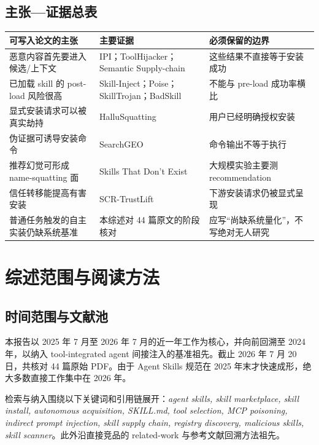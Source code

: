 \documentclass[11pt,a4paper]{ctexart}
\begin{document}
\subsection{主张—证据总表}

\begin{center}
\small
\begin{tabularx}{\textwidth}{L{4.0cm}Y L{4.0cm}}
\toprule
\textbf{可写入论文的主张} & \textbf{主要证据} & \textbf{必须保留的边界} \\
\midrule
恶意内容首先要进入候选/上下文 & IPI；ToolHijacker；Semantic Supply-chain & 这些结果不直接等于安装成功 \\
已加载 skill 的 post-load 风险很高 & Skill-Inject；Poise；SkillTrojan；BadSkill & 不能与 pre-load 成功率横比 \\
显式安装请求可以被真实劫持 & HalluSquatting & 用户已经明确授权安装 \\
伪证据可诱导安装命令 & SearchGEO & 命令输出不等于执行 \\
推荐幻觉可形成 name-squatting 面 & Skills That Don't Exist & 大规模实验主要测 recommendation \\
信任转移能提高有害安装 & SCR-TrustLift & 下游安装请求仍被显式呈现 \\
普通任务触发的自主实装仍缺系统基准 & 本综述对 44 篇原文的阶段核对 & 应写“尚缺系统量化”，不写绝对无人研究 \\
\bottomrule
\end{tabularx}
\end{center}

\clearpage
\section{综述范围与阅读方法}

\subsection{时间范围与文献池}

本报告以 2025 年 7 月至 2026 年 7 月的近一年工作为核心，并向前回溯至 2024 年，以纳入 tool-integrated agent 间接注入的基准祖先。截止 2026 年 7 月 20 日，共核对 44 篇原始 PDF。由于 Agent Skills 规范在 2025 年末才快速成形，绝大多数直接工作集中在 2026 年。

检索与纳入围绕以下关键词和引用链展开：\emph{agent skills, skill marketplace, skill install, autonomous acquisition, SKILL.md, tool selection, MCP poisoning, indirect prompt injection, skill supply chain, registry discovery, malicious skills, skill scanner}。此外沿直接竞品的 related-work 与参考文献回溯方法祖先。
\end{document}
